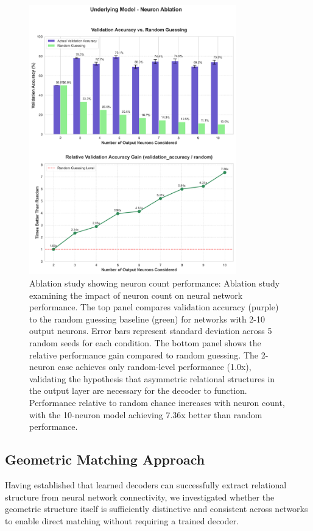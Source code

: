 \documentclass[11pt]{article}
\begin{document}
\begin{figure}[htbp]
\centering
\includegraphics[width=0.8\textwidth]{figures/ablation-study-neuron-count-performance.png}
\caption{Ablation study showing neuron count performance: Ablation study examining the impact of neuron count on neural network performance. The top panel compares validation accuracy (purple) to the random guessing baseline (green) for networks with 2-10 output neurons. Error bars represent standard deviation across 5 random seeds for each condition. The bottom panel shows the relative performance gain compared to random guessing. The 2-neuron case achieves only random-level performance (1.0x), validating the hypothesis that asymmetric relational structures in the output layer are necessary for the decoder to function. Performance relative to random chance increases with neuron count, with the 10-neuron model achieving 7.36x better than random performance.}
\label{fig:ablation-study}
\end{figure}

\subsection{Geometric Matching Approach}

Having established that learned decoders can successfully extract relational structure from neural network connectivity, we investigated whether the geometric structure itself is sufficiently distinctive and consistent across networks to enable direct matching without requiring a trained decoder.
\end{document}
